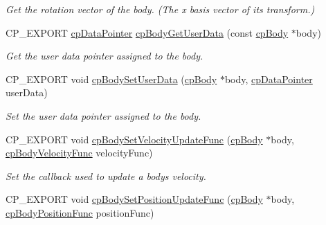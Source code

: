\begin{DoxyCompactItemize}
\begin{DoxyCompactList}\small\item\em Get the rotation vector of the body. (The x basis vector of it\textquotesingle{}s transform.) \end{DoxyCompactList}\item 
\mbox{\label{group__cp_body_gaec65efba933eb1072cc9c1088e15ba1f}} 
C\+P\+\_\+\+E\+X\+P\+O\+RT \mbox{\hyperlink{group__basic_types_ga2ac2c3c31e21893941f9e4f8ee279447}{cp\+Data\+Pointer}} \mbox{\hyperlink{group__cp_body_gaec65efba933eb1072cc9c1088e15ba1f}{cp\+Body\+Get\+User\+Data}} (const \mbox{\hyperlink{structcp_body}{cp\+Body}} $\ast$body)
\begin{DoxyCompactList}\small\item\em Get the user data pointer assigned to the body. \end{DoxyCompactList}\item 
\mbox{\label{group__cp_body_gab2bb264a606f865e3aaff1536b1d8de8}} 
C\+P\+\_\+\+E\+X\+P\+O\+RT void \mbox{\hyperlink{group__cp_body_gab2bb264a606f865e3aaff1536b1d8de8}{cp\+Body\+Set\+User\+Data}} (\mbox{\hyperlink{structcp_body}{cp\+Body}} $\ast$body, \mbox{\hyperlink{group__basic_types_ga2ac2c3c31e21893941f9e4f8ee279447}{cp\+Data\+Pointer}} user\+Data)
\begin{DoxyCompactList}\small\item\em Set the user data pointer assigned to the body. \end{DoxyCompactList}\item 
\mbox{\label{group__cp_body_gafb735af90ab6087215af8efbebca771c}} 
C\+P\+\_\+\+E\+X\+P\+O\+RT void \mbox{\hyperlink{group__cp_body_gafb735af90ab6087215af8efbebca771c}{cp\+Body\+Set\+Velocity\+Update\+Func}} (\mbox{\hyperlink{structcp_body}{cp\+Body}} $\ast$body, \mbox{\hyperlink{group__cp_body_gaa7a1f4706fb8e879c356ae99035ead71}{cp\+Body\+Velocity\+Func}} velocity\+Func)
\begin{DoxyCompactList}\small\item\em Set the callback used to update a body\textquotesingle{}s velocity. \end{DoxyCompactList}\item 
C\+P\+\_\+\+E\+X\+P\+O\+RT void \mbox{\hyperlink{group__cp_body_gaa3c5a0ad4bfa91f4e24fb558c743fdba}{cp\+Body\+Set\+Position\+Update\+Func}} (\mbox{\hyperlink{structcp_body}{cp\+Body}} $\ast$body, \mbox{\hyperlink{group__cp_body_ga3386e3b0b4156289ab6099cc64c952e7}{cp\+Body\+Position\+Func}} position\+Func)

\end{DoxyCompactItemize}
